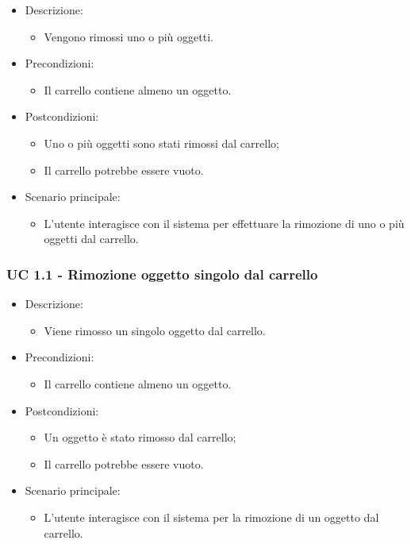 \begin{itemize}
	
	\item Descrizione:
	\begin{itemize}
		\item Vengono rimossi uno o più oggetti.
	\end{itemize}
	
	\item Precondizioni:
	\begin{itemize}
		\item Il carrello contiene almeno un oggetto.
	\end{itemize}
	
	\item Postcondizioni:
	\begin{itemize}
		\item Uno o più oggetti sono stati rimossi dal carrello;
		\item Il carrello potrebbe essere vuoto.
	\end{itemize}
	
	\item Scenario principale:
	\begin{itemize}
		\item L'utente interagisce con il sistema per effettuare la rimozione di uno o più oggetti dal carrello.
	\end{itemize}
	
\end{itemize}


\subsubsection{UC 1.1 - Rimozione oggetto singolo dal carrello}

\begin{itemize}
	
	\item Descrizione:
	\begin{itemize}
		\item Viene rimosso un singolo oggetto dal carrello.
	\end{itemize}
	
	\item Precondizioni:
	\begin{itemize}
		\item Il carrello contiene almeno un oggetto.
	\end{itemize}
	
	\item Postcondizioni:
	\begin{itemize}
		\item Un oggetto è stato rimosso dal carrello;
		\item Il carrello potrebbe essere vuoto.
	\end{itemize}
	
	\item Scenario principale:
	\begin{itemize}
		\item L'utente interagisce con il sistema per la rimozione di un oggetto dal carrello.
	\end{itemize}
	
\end{itemize}

